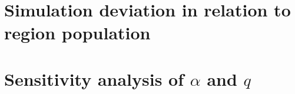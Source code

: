 \section{Simulation deviation in relation to region population}






\section{Sensitivity analysis of $\alpha$ and $q$}

